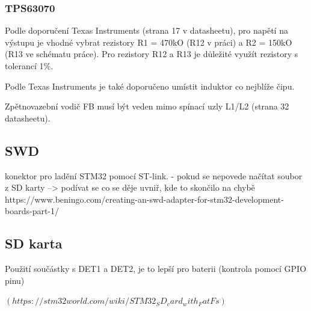 \documentclass[12pt, a4paper]{article}
\begin{document}
\subsubsection{TPS63070}
Podle doporučení Texas Instruments (strana 17 v datasheetu), pro napětí na výstupu je vhodné vybrat rezistory R1 = 470kO (R12 v práci) a R2 = 150kO (R13 ve schématu práce).
Pro rezistory R12 a R13 je důležité využít rezistory s tolerancí 1\%.

Podle Texas Instruments je také doporučeno umístit induktor co nejblíže čipu.

Zpětnovazební vodič FB musí být veden mimo spínací uzly L1/L2 (strana 32 datasheetu).


\subsection{SWD}
konektor pro ladění STM32 pomocí ST-link.
- pokud se nepovede načítat soubor z SD karty --> podívat se co se děje uvniř, kde to skončilo na chybě
https://www.beningo.com/creating-an-swd-adapter-for-stm32-development-boards-part-1/


\subsection{SD karta}
Použití součástky s DET1 a DET2, je to lepší pro baterii (kontrola pomocí GPIO pinu)

$(https://stm32world.com/wiki/STM32_SD_card_with_FatFs)$
\end{document}
